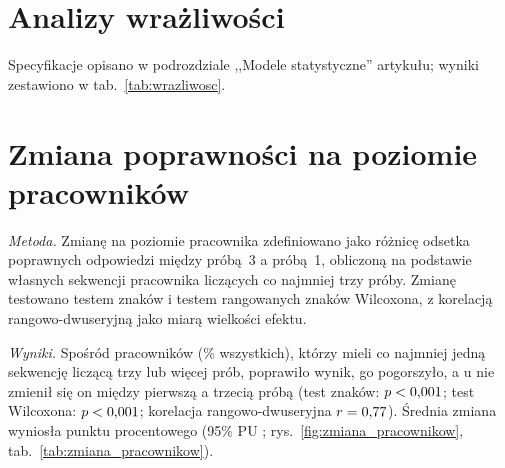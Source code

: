 \documentclass[11pt]{article}
\begin{document}
\begin{table}[htbp]
\centering
\caption{Odsetek poprawnych odpowiedzi według odstępu od poprzedniej próby tego samego pytania,
dla odpowiedzi poprzednio poprawnych (po lewej) i błędnych (po prawej).}
\label{tab:retencja_wg_odstepu}
\small
{}
\end{table}

\section{Analizy wrażliwości}
Specyfikacje opisano w podrozdziale ,,Modele statystyczne'' artykułu; wyniki zestawiono
w tab.~\ref{tab:wrazliwosc}.

\begin{table}[htbp]
\centering
\caption{Analizy wrażliwości: iloraz szans poprawnej odpowiedzi na podwojenie numeru próby (model M1).}
\label{tab:wrazliwosc}
\small
{}
\end{table}

\section{Zmiana poprawności na poziomie pracowników}
\emph{Metoda.} Zmianę na poziomie pracownika zdefiniowano jako różnicę odsetka poprawnych odpowiedzi
między próbą~3 a próbą~1, obliczoną na podstawie własnych sekwencji pracownika liczących co najmniej
trzy próby. Zmianę testowano testem znaków i testem rangowanych znaków Wilcoxona, z korelacją
rangowo-dwuseryjną jako miarą wielkości efektu.

\emph{Wyniki.} Spośród \EmpN{} pracowników (\EmpSharePct\% wszystkich), którzy mieli co najmniej jedną
sekwencję liczącą trzy lub więcej prób, \EmpImproved{} poprawiło wynik, \EmpWorsened{} go pogorszyło,
a u \EmpUnchanged{} nie zmienił się on między pierwszą a trzecią próbą (test znaków: $p < 0{,}001$; test
Wilcoxona: $p < 0{,}001$; korelacja rangowo-dwuseryjna $r = 0{,}77$). Średnia zmiana wyniosła
\EmpMeanChange{} punktu procentowego (95\% PU \EmpMeanChangeCI; rys.~\ref{fig:zmiana_pracownikow},
tab.~\ref{tab:zmiana_pracownikow}).
\end{document}
